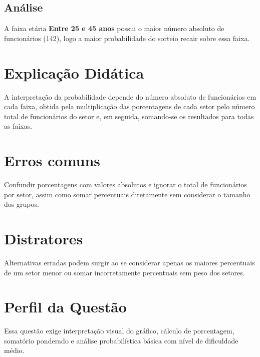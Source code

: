 \documentclass{article}
\begin{document}
\subsection{Análise}
A faixa etária \textbf{Entre 25 e 45 anos} possui o maior número absoluto de funcionários (142), logo a maior probabilidade do sorteio recair sobre essa faixa.

\section{Explicação Didática}

A interpretação da probabilidade depende do número absoluto de funcionários em cada faixa, obtida pela multiplicação das porcentagens de cada setor pelo número total de funcionários do setor e, em seguida, somando-se os resultados para todas as faixas.

\section{Erros comuns}
Confundir porcentagens com valores absolutos e ignorar o total de funcionários por setor, assim como somar percentuais diretamente sem considerar o tamanho dos grupos.

\section{Distratores}
Alternativas erradas podem surgir ao se considerar apenas os maiores percentuais de um setor menor ou somar incorretamente percentuais sem peso dos setores.

\section{Perfil da Questão}
Essa questão exige interpretação visual do gráfico, cálculo de porcentagem, somatório ponderado e análise probabilística básica com nível de dificuldade médio.
\end{document}
